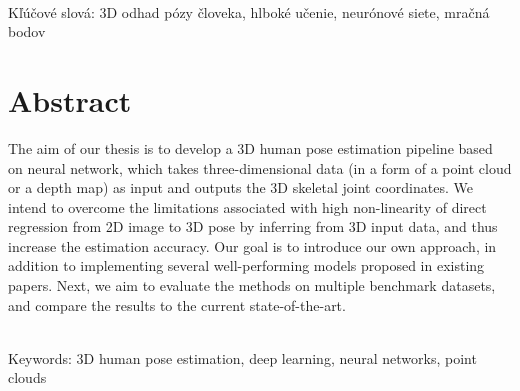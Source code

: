 \documentclass[12pt, a4paper, oneside]{book}
\begin{document}
~\\
Kľúčové slová: 3D odhad pózy človeka, hlboké učenie, neurónové siete, mračná bodov
\vfill\eject 

\chapter*{Abstract}\label{chap:abstract_en}
The aim of our thesis is to develop a 3D human pose estimation pipeline based on neural network, which takes three-dimensional data (in a form of a point cloud or a depth map) as input and outputs the 3D skeletal joint coordinates. We intend to overcome the limitations associated with high non-linearity of direct regression from 2D image to 3D pose by inferring from 3D input data, and thus increase the estimation accuracy. Our goal is to introduce our own approach, in addition to implementing several well-performing models proposed in existing papers. Next, we aim to evaluate the methods on multiple benchmark datasets, and compare the results to the current state-of-the-art.

~\\
Keywords: 3D human pose estimation, deep learning, neural networks, point clouds
\vfill\eject 


\tableofcontents

\listoftables
\listoffigures

\mainmatter










\backmatter

\nocite{*}


\end{document}
